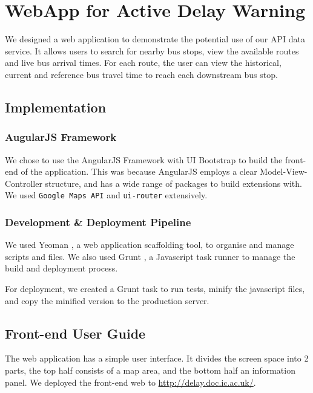 \chapter{WebApp for Active Delay Warning}
\label{ch:mobile_app}

\par We designed a web application to demonstrate the potential use of our API data service. It allows users to search for nearby bus stops, view the available routes and live bus arrival times. For each route, the user can view the historical, current and reference bus travel time to reach each downstream bus stop.

\section{Implementation}
\subsection{AugularJS Framework}
\par We chose to use the AngularJS Framework \cite{angularjs} with UI Bootstrap \cite{bootstrap} to build the front-end of the application. This was because AngularJS employs a clear Model-View-Controller structure, and has a wide range of packages to build extensions with. We used \texttt{Google Maps API} \cite{angular_google_maps} and \texttt{ui-router} \cite{ui_router} extensively.

\subsection{Development \& Deployment Pipeline}
\par We used Yeoman \cite{yeoman}, a web application scaffolding tool, to organise and manage scripts and files. We also used Grunt \cite{grunt}, a Javascript task runner to manage the build and deployment process.

\par For deployment, we created a Grunt task to run tests, minify the javascript files, and copy the minified version to the production server.

\section{Front-end User Guide}
\par The web application has a simple user interface. It divides the screen space into 2 parts, the top half consists of a map area, and the bottom half an information panel. We deployed the front-end web to \url{http://delay.doc.ic.ac.uk/}.


